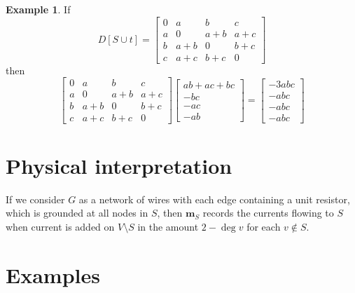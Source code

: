 \documentclass{amsart}
\theoremstyle{definition}
\newtheorem{eg}[thm]{Example}
\begin{document}
\begin{eg}
If 
$$
D[S \cup t] = \begin{bmatrix}
0 & a & b & c \\
a & 0 & a + b & a + c \\
b & a + b & 0 & b + c \\
c & a + c & b + c & 0
\end{bmatrix}
$$
then
$$
 \begin{bmatrix}
0 & a & b & c \\
a & 0 & a + b & a + c \\
b & a + b & 0 & b + c \\
c & a + c & b + c & 0
\end{bmatrix}
\begin{bmatrix}
ab + ac + bc \\ -bc \\ -ac \\ -ab 
\end{bmatrix}
= \begin{bmatrix}
-3abc \\ -abc \\ -abc \\ -abc
\end{bmatrix}
$$
\end{eg}

\section{Physical interpretation}

If we consider $G$ as a network of wires with each edge containing a unit resistor,
which is grounded at all nodes in $S$,
then $\mathbf{m}_S$ records the currents flowing to $S$
when current is added on $V\setminus S$ in the amount $2 - \deg v$
for each $v\not\in S$.

\section{Examples}
\end{document}
